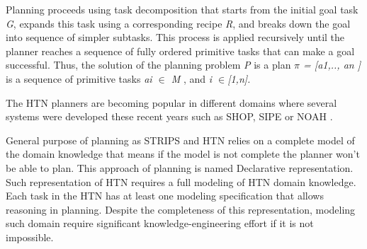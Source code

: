 Planning proceeds using task decomposition that starts from the initial goal task \textit{G}, expands this task using a corresponding recipe \textit{R}, and breaks down the goal into sequence of simpler subtasks. This process is applied recursively until the planner reaches a sequence of fully ordered primitive tasks that can make a goal successful. Thus, the solution of the planning problem\textit{ P} is a plan\textit{ $\pi$ = [a1,.., an ]} is a sequence of primitive tasks  \textit{ai $\in$ M }, and \textit{i $\in $[1,n].}

The HTN planners are becoming popular in different domains where several systems were developed these recent years such as SHOP\cite{nau1999shop}, SIPE \cite{wilkins1988practical} or NOAH \cite{sacerdoti1975structure}. 


General purpose of planning as STRIPS and HTN relies on a complete model of the domain knowledge that means if the model is not complete the planner won’t be able to plan. This approach of planning is named Declarative representation. Such representation of HTN requires a full modeling of HTN domain knowledge. Each task in the HTN has at least one modeling specification that allows reasoning in planning. Despite the completeness of this representation, modeling such domain require significant knowledge-engineering effort if it is not impossible.
